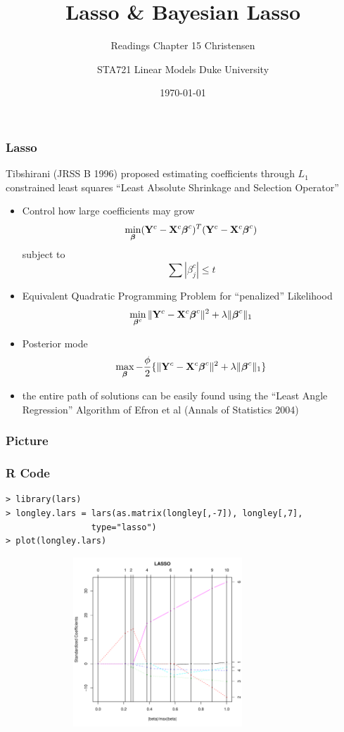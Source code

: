 \documentclass[handout]{beamer}
\title{Lasso \& Bayesian  Lasso }
\subtitle{Readings Chapter 15 Christensen}
\institute{Merlise Clyde}
\author{STA721 Linear Models Duke University}
\date{\today}
\begin{document}
\maketitle


\begin{frame}
  \frametitle{Lasso}
Tibshirani (JRSS B 1996) proposed estimating coefficients through
$L_1$ constrained least squares  ``Least Absolute Shrinkage and
Selection Operator''
\begin{itemize}
 \item Control how large coefficients may grow \pause
    $$\min_{\boldsymbol{\beta}} (\mathbf{Y}^c - \mathbf{X}^c \boldsymbol{\beta}^c)^T (\mathbf{Y}^c - \mathbf{X}^c\boldsymbol{\beta}^c)$$
    subject to
    $$ \sum |\beta^c_j| \le t$$ \pause
  \item Equivalent Quadratic Programming Problem for ``penalized'' Likelihood
    $$\min_{\boldsymbol{\beta}^c} \| \mathbf{Y}^c - \mathbf{X}^c \boldsymbol{\beta}^c\|^2 + \lambda \|\boldsymbol{\beta}^c\|_1$$ \pause
  \item Posterior mode
  $$
\max_{\boldsymbol{\beta}} -\frac{\phi}{2} \{ \| \mathbf{Y}^c - \mathbf{X}^c \boldsymbol{\beta}^c\|^2 + \lambda \|\boldsymbol{\beta}^c\|_1 \}
$$ \pause
 \item the entire path of solutions can be easily found using the
   ``Least Angle Regression'' Algorithm of Efron et al (Annals of
   Statistics 2004)
\end{itemize}
\end{frame}
\begin{frame}
  \frametitle{Picture}
  
\end{frame}
\begin{frame}[fragile]
  \frametitle{R Code}
\begin{verbatim}
> library(lars)
> longley.lars = lars(as.matrix(longley[,-7]), longley[,7],
                 type="lasso")
> plot(longley.lars)
\end{verbatim}
\includegraphics[height=2.5in,width=4.5in]{longley-lars}
\end{frame}
\end{document}
